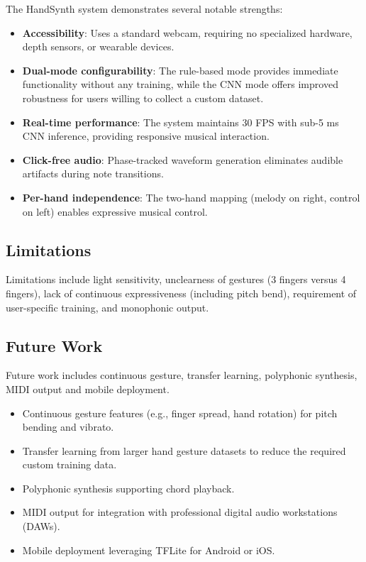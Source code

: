 \documentclass[conference]{IEEEtran}
\begin{document}
The HandSynth system demonstrates several notable strengths:

\begin{itemize}
\item \textbf{Accessibility}: Uses a standard webcam, requiring no specialized hardware, depth sensors, or wearable devices.
\item \textbf{Dual-mode configurability}: The rule-based mode provides immediate functionality without any training, while the CNN mode offers improved robustness for users willing to collect a custom dataset.
\item \textbf{Real-time performance}: The system maintains 30 FPS with sub-5 ms CNN inference, providing responsive musical interaction.
\item \textbf{Click-free audio}: Phase-tracked waveform generation eliminates audible artifacts during note transitions.
\item \textbf{Per-hand independence}: The two-hand mapping (melody on right, control on left) enables expressive musical control.
\end{itemize}

\subsection{Limitations}

Limitations include light sensitivity, unclearness of gestures (3 fingers versus 4 fingers), lack of continuous expressiveness (including pitch bend), requirement of user-specific training, and monophonic output.

\subsection{Future Work}

Future work includes continuous gesture, transfer learning, polyphonic synthesis, MIDI output and mobile deployment.

\begin{itemize}
\item Continuous gesture features (e.g., finger spread, hand rotation) for pitch bending and vibrato.
\item Transfer learning from larger hand gesture datasets to reduce the required custom training data.
\item Polyphonic synthesis supporting chord playback.
\item MIDI output for integration with professional digital audio workstations (DAWs).
\item Mobile deployment leveraging TFLite for Android or iOS.
\end{itemize}
\end{document}
